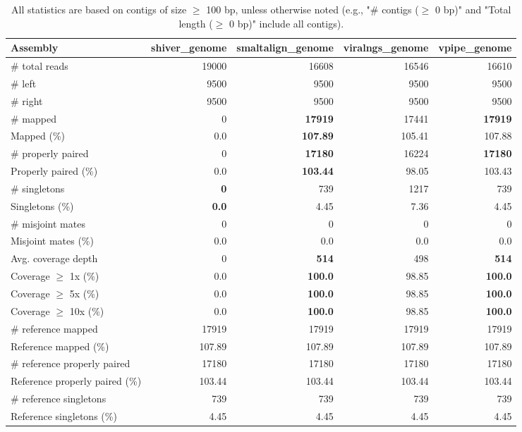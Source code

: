 \documentclass[12pt,a4paper]{article}
\begin{document}
\begin{table}[ht]
\begin{center}
\caption{All statistics are based on contigs of size $\geq$ 100 bp, unless otherwise noted (e.g., "\# contigs ($\geq$ 0 bp)" and "Total length ($\geq$ 0 bp)" include all contigs).}
\begin{tabular}{|l*{4}{|r}|}
\hline
Assembly & shiver\_genome & smaltalign\_genome & viralngs\_genome & vpipe\_genome \\ \hline
\# total reads & 19000 & 16608 & 16546 & 16610 \\ \hline
\# left & 9500 & 9500 & 9500 & 9500 \\ \hline
\# right & 9500 & 9500 & 9500 & 9500 \\ \hline
\# mapped & 0 & {\bf 17919} & 17441 & {\bf 17919} \\ \hline
Mapped (\%) & 0.0 & {\bf 107.89} & 105.41 & 107.88 \\ \hline
\# properly paired & 0 & {\bf 17180} & 16224 & {\bf 17180} \\ \hline
Properly paired (\%) & 0.0 & {\bf 103.44} & 98.05 & 103.43 \\ \hline
\# singletons & {\bf 0} & 739 & 1217 & 739 \\ \hline
Singletons (\%) & {\bf 0.0} & 4.45 & 7.36 & 4.45 \\ \hline
\# misjoint mates & 0 & 0 & 0 & 0 \\ \hline
Misjoint mates (\%) & 0.0 & 0.0 & 0.0 & 0.0 \\ \hline
Avg. coverage depth & 0 & {\bf 514} & 498 & {\bf 514} \\ \hline
Coverage $\geq$ 1x (\%) & 0.0 & {\bf 100.0} & 98.85 & {\bf 100.0} \\ \hline
Coverage $\geq$ 5x (\%) & 0.0 & {\bf 100.0} & 98.85 & {\bf 100.0} \\ \hline
Coverage $\geq$ 10x (\%) & 0.0 & {\bf 100.0} & 98.85 & {\bf 100.0} \\ \hline
\# reference mapped & 17919 & 17919 & 17919 & 17919 \\ \hline
Reference mapped (\%) & 107.89 & 107.89 & 107.89 & 107.89 \\ \hline
\# reference properly paired & 17180 & 17180 & 17180 & 17180 \\ \hline
Reference properly paired (\%) & 103.44 & 103.44 & 103.44 & 103.44 \\ \hline
\# reference singletons & 739 & 739 & 739 & 739 \\ \hline
Reference singletons (\%) & 4.45 & 4.45 & 4.45 & 4.45 \\ \hline

\end{tabular}
\end{center}
\end{table}
\end{document}
